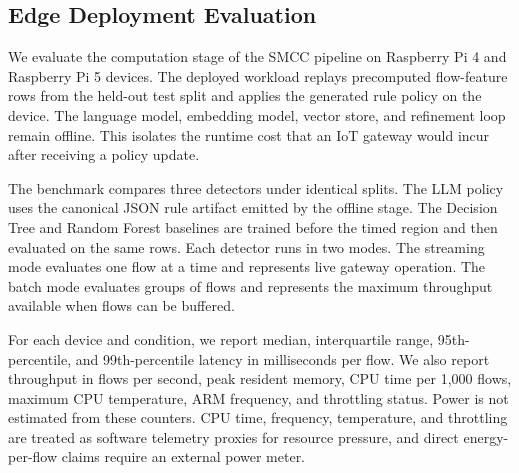 \subsection{Edge Deployment Evaluation}
\label{subsec:edge_deployment}

We evaluate the computation stage of the SMCC pipeline on Raspberry Pi 4 and
Raspberry Pi 5 devices. The deployed workload replays precomputed flow-feature
rows from the held-out test split and applies the generated rule policy on the
device. The language model, embedding model, vector store, and refinement loop
remain offline. This isolates the runtime cost that an IoT gateway would incur
after receiving a policy update.

The benchmark compares three detectors under identical splits. The LLM policy
uses the canonical JSON rule artifact emitted by the offline stage. The
Decision Tree and Random Forest baselines are trained before the timed region
and then evaluated on the same rows. Each detector runs in two modes. The
streaming mode evaluates one flow at a time and represents live gateway
operation. The batch mode evaluates groups of flows and represents the maximum
throughput available when flows can be buffered.

For each device and condition, we report median, interquartile range,
95th-percentile, and 99th-percentile latency in milliseconds per flow. We also
report throughput in flows per second, peak resident memory, CPU time per
1,000 flows, maximum CPU temperature, ARM frequency, and throttling status.
Power is not estimated from these counters. CPU time, frequency, temperature,
and throttling are treated as software telemetry proxies for resource pressure,
and direct energy-per-flow claims require an external power meter.
